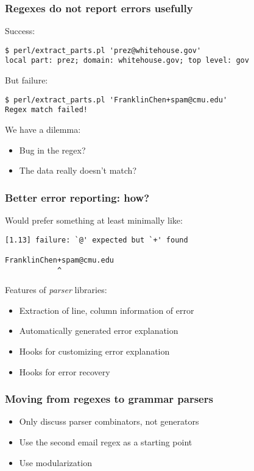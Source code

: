 \begin{frame}[fragile]
  \frametitle{Regexes do not report errors usefully}

  Success:
  \begin{verbatim}
$ perl/extract_parts.pl 'prez@whitehouse.gov'
local part: prez; domain: whitehouse.gov; top level: gov
  \end{verbatim}

  But failure:
  \begin{verbatim}
$ perl/extract_parts.pl 'FranklinChen+spam@cmu.edu'
Regex match failed!
  \end{verbatim}
  

  We have a dilemma:
  \begin{itemize}
    \item Bug in the regex?
    \item The data really doesn't match?
  \end{itemize}

\end{frame}

\begin{frame}[fragile]
  \frametitle{Better error reporting: how?}

  Would prefer something at least minimally like:

  \begin{verbatim}
[1.13] failure: `@' expected but `+' found

FranklinChen+spam@cmu.edu
            ^
  \end{verbatim}

  Features of \emph{parser} libraries:
  \begin{itemize}
    \item Extraction of line, column information of error
    \item Automatically generated error explanation
    \item Hooks for customizing error explanation
    \item Hooks for error recovery
  \end{itemize}
\end{frame}

\begin{frame}
  \frametitle{Moving from regexes to grammar parsers}

  \begin{itemize}
    \item Only discuss parser combinators, not generators
    \item Use the second email regex as a starting point
    \item Use modularization
  \end{itemize}
\end{frame}


